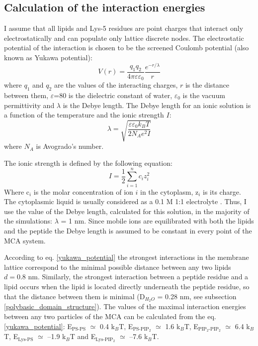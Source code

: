 \subsection{Calculation of the interaction energies}

\label{interaction_energies}

I assume that all lipids and Lys-5 residues are point charges that interact only electrostatically and can populate only lattice discrete nodes. The electrostatic potential of the interaction is chosen to be the screened Coulomb potential (also known as Yukawa potential):
\begin{equation}
\label{yukawa_potential}
 V(r) = \frac{q_1q_2}{4\pi\varepsilon\varepsilon_0}\frac{e^{-r/\lambda}}{r}
\end{equation}
where $q_1$ and $q_2$ are the values of the interacting charges, $r$ is the distance between them, $\varepsilon$=80 is the dielectric constant of water, $\varepsilon_0$ is the vacuum permittivity and $\lambda$ is the Debye length. The Debye length for an ionic solution is a function of the temperature and the ionic strength $I$:
\begin{equation}
 \lambda = \sqrt{\frac{\varepsilon\varepsilon_0k_BT}{2N_Ae^2I}}
\end{equation}
where $N_A$ is Avogrado's number.

The ionic strength is defined by the following equation:
\begin{equation}
 I=\frac{1}{2}\sum_{i=1}^{n}c_iz_i^2
\end{equation}
Where c$_i$ is the molar concentration of ion $i$ in the cytoplasm, z$_i$ is its charge. The cytoplasmic liquid is usually considered as a 0.1 M 1:1 electrolyte \cite{Khelashvili2008,May2000}. Thus, I use the value of the Debye length, calculated for this solution, in the majority of the simulations: $\lambda$ = 1 nm. Since mobile ions are equilibrated with both the lipids and the peptide the Debye length is assumed to be constant in every point of the MCA system.

According to eq. \eqref{yukawa_potential} the strongest interactions in the membrane lattice correspond to the minimal possible distance between any two lipids $d = 0.8$ nm. Similarly, the strongest interaction between a peptide residue and a lipid occurs when the lipid is located directly underneath the peptide residue, so that the distance between them is minimal (D$_{H_2O}$ = 0.28 nm, see subsection \ref{polybasic_domain_structure}). The values of the maximal interaction energies between any two particles of the MCA can be calculated from the eq. \eqref{yukawa_potential}: E$_\text{PS-PS}$ $\simeq$ 0.4 k$_B$T, E$_\text{PS-PIP$_2$}$ $\simeq$ 1.6 k$_B$T, E$_\text{PIP$_2$-PIP$_2$}$ $\simeq$ 6.4 k$_B$T, E$_\text{Lys-PS}$ $\simeq$ --1.9 k$_B$T and E$_\text{Lys-PIP$_2$}$ $\simeq$ --7.6 k$_B$T.

